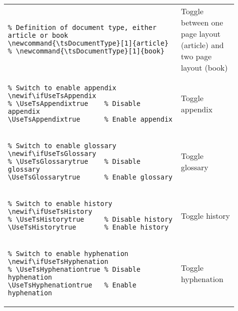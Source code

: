 \begin{footnotesize}
    \renewcommand*{\arraystretch}{1.5}
    \begin{longtable}{ | P{0.7\linewidth} | p{0.23\linewidth} | }
        \hline
         &          \\
        \hline
        \begin{BVerbatim}
\newcommand{\tsDocumentType}[1]{article}
        \end{BVerbatim}
         & Toggle between one page layout (article) and two page layout (book)  \\
        \hline
        \begin{BVerbatim}
\newif\ifUseTsAppendix
\UseTsAppendixtrue      %
        \end{BVerbatim}
         & Toggle appendix                   \\
        \hline
        \begin{BVerbatim}
\newif\ifUseTsGlossary
\UseTsGlossarytrue      %
        \end{BVerbatim}
         & Toggle glossary                   \\
        \hline
        \begin{BVerbatim}
\newif\ifUseTsHistory
\UseTsHistorytrue       %
        \end{BVerbatim}
         & Toggle history                    \\
        \hline
        \begin{BVerbatim}
\newif\ifUseTsHyphenation
\UseTsHyphenationtrue   %
        \end{BVerbatim}
         & Toggle \newline  hyphenation      \\

\end{longtable}
\end{footnotesize}
